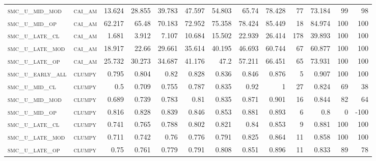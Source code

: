 \begin{landscape}
\begin{center}
\begin{footnotesize}
\begin{longtable}{llrrrrrrrr|rrr}
\textsc{smc\_u\_mid\_mod  } & \textsc{cai\_am   }   & 13.624   & 28.855   & 39.783   & 47.597   & 54.803   & 65.74    & 78.428    & 77     & 73.184        & 99            & 98              \\
\textsc{smc\_u\_mid\_op   } & \textsc{cai\_am   }   & 62.217   & 65.48    & 70.183   & 72.952   & 75.358   & 78.424   & 85.449    & 18     & 84.974        & 100           & 100             \\
\textsc{smc\_u\_late\_cl  } & \textsc{cai\_am   }   & 1.681    & 3.912    & 7.107    & 10.684   & 15.502   & 22.939   & 26.414    & 178    & 39.893        & 100           & 100             \\
\textsc{smc\_u\_late\_mod } & \textsc{cai\_am   }   & 18.917   & 22.66    & 29.661   & 35.614   & 40.195   & 46.693   & 60.744    & 67     & 60.877        & 100           & 100             \\
\textsc{smc\_u\_late\_op  } & \textsc{cai\_am   }   & 25.732   & 30.273   & 34.687   & 41.176   & 47.2     & 57.211   & 66.451    & 65     & 73.931        & 100           & 100             \\
\textsc{smc\_u\_early\_all} & \textsc{clumpy    }   & 0.795    & 0.804    & 0.82     & 0.828    & 0.836    & 0.846    & 0.876     & 5      & 0.907         & 100           & 100             \\
\textsc{smc\_u\_mid\_cl   } & \textsc{clumpy    }   & 0.5      & 0.709    & 0.755    & 0.787    & 0.835    & 0.92     & 1         & 27     & 0.824         & 69            & 38              \\
\textsc{smc\_u\_mid\_mod  } & \textsc{clumpy    }   & 0.689    & 0.739    & 0.783    & 0.81     & 0.835    & 0.871    & 0.901     & 16     & 0.844         & 82            & 64              \\
\textsc{smc\_u\_mid\_op   } & \textsc{clumpy    }   & 0.816    & 0.828    & 0.839    & 0.846    & 0.853    & 0.881    & 0.893     & 6      & 0.8           & 0             & -100            \\
\textsc{smc\_u\_late\_cl  } & \textsc{clumpy    }   & 0.741    & 0.765    & 0.788    & 0.802    & 0.821    & 0.84     & 0.853     & 9      & 0.881         & 100           & 100             \\
\textsc{smc\_u\_late\_mod } & \textsc{clumpy    }   & 0.711    & 0.742    & 0.76     & 0.776    & 0.791    & 0.825    & 0.864     & 11     & 0.858         & 100           & 100             \\
\textsc{smc\_u\_late\_op  } & \textsc{clumpy    }   & 0.75     & 0.761    & 0.779    & 0.791    & 0.808    & 0.851    & 0.896     & 11     & 0.833         & 89            & 78              \\

\end{longtable}
\end{footnotesize}
\end{center}
\end{landscape}
